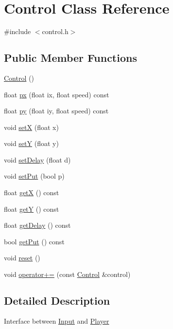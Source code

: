 \hypertarget{class_control}{\section{Control Class Reference}
\label{class_control}
}


{\ttfamily \#include $<$control.\-h$>$}

\subsection*{Public Member Functions}
\begin{DoxyCompactItemize}
\item 
\hyperlink{class_control_aa730aeda4517f40bc48ba1e46ebded77}{Control} ()
\item 
float \hyperlink{class_control_a8884ee3413a1e728750ca078c54debbb}{px} (float ix, float speed) const 
\item 
float \hyperlink{class_control_af20f59c16802372fb4f9778c9985c299}{py} (float iy, float speed) const 
\item 
void \hyperlink{class_control_a8143cd648439e87164f4199b8d5dbb4d}{set\-X} (float x)
\item 
void \hyperlink{class_control_a06aadb56b838ec4b3b594f929270378c}{set\-Y} (float y)
\item 
void \hyperlink{class_control_ab2a5593076c0ee41cd90f490a1fde83d}{set\-Delay} (float d)
\item 
void \hyperlink{class_control_a9b2ccced88b60c2f5eddcc7a69a41462}{set\-Put} (bool p)
\item 
float \hyperlink{class_control_a20677011cf6c8b0acb0914a6b38e3b24}{get\-X} () const 
\item 
float \hyperlink{class_control_a77287e717f1da098f6649801cc60e2c4}{get\-Y} () const 
\item 
float \hyperlink{class_control_a27dcab7b0295429cbd49ec00f6d06978}{get\-Delay} () const 
\item 
bool \hyperlink{class_control_a12442ff0f59914230dd7befeecc92f2d}{get\-Put} () const 
\item 
void \hyperlink{class_control_a40dcdbc8a1409217b3efe4ae97e5df8d}{reset} ()
\item 
void \hyperlink{class_control_a3734112d2e86f5f98172739028536f6e}{operator+=} (const \hyperlink{class_control}{Control} \&control)
\end{DoxyCompactItemize}


\subsection{Detailed Description}
Interface between \hyperlink{class_input}{Input} and \hyperlink{class_player}{Player} 

